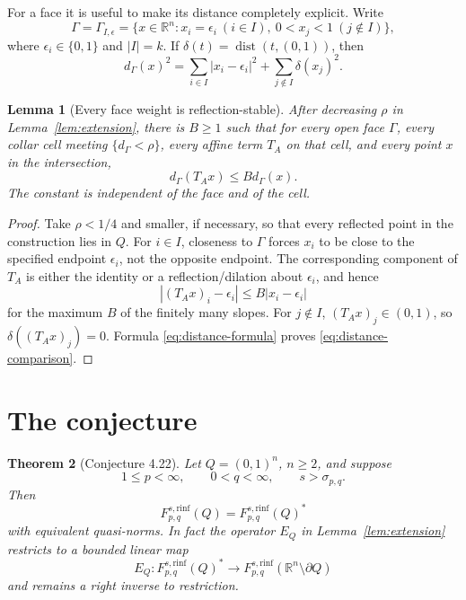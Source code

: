 \documentclass[11pt]{article}
\newtheorem{theorem}{Theorem}
\newtheorem{lemma}[theorem]{Lemma}
\newcommand{\R}{\mathbb R}
\newcommand{\dist}{\operatorname{dist}}
\newcommand{\rinf}{\mathrm{rinf}}
\begin{document}
For a face it is useful to make its distance completely explicit.  Write
\begin{equation}\label{eq:face}
 \Gamma=\Gamma_{I,\epsilon}
 =\{x\in\R^n:x_i=\epsilon_i\ (i\in I),\ 0<x_j<1\ (j\notin I)\},
\end{equation}
where $\epsilon_i\in\{0,1\}$ and $|I|=k$.  If
$\delta(t)=\dist(t,(0,1))$, then
\begin{equation}\label{eq:distance-formula}
 d_\Gamma(x)^2=
 \sum_{i\in I}|x_i-\epsilon_i|^2+
 \sum_{j\notin I}\delta(x_j)^2.
\end{equation}

\begin{lemma}[Every face weight is reflection-stable]\label{lem:distance}
After decreasing $\rho$ in Lemma~\ref{lem:extension}, there is $B\ge1$
such that for every open face $\Gamma$, every collar cell meeting
$\{d_\Gamma<\rho\}$, every affine term $T_A$ on that cell, and every point
$x$ in the intersection,
\begin{equation}\label{eq:distance-comparison}
 d_\Gamma(T_Ax)\le B d_\Gamma(x).
\end{equation}
The constant is independent of the face and of the cell.
\end{lemma}

\begin{proof}
Take $\rho<1/4$ and smaller, if necessary, so that every reflected point
in the construction lies in $Q$.  For $i\in I$, closeness to $\Gamma$
forces $x_i$ to be close to the specified endpoint $\epsilon_i$, not the
opposite endpoint.  The corresponding component of $T_A$ is either the
identity or a reflection/dilation about $\epsilon_i$, and hence
\[
 |(T_Ax)_i-\epsilon_i|\le B|x_i-\epsilon_i|
\]
for the maximum $B$ of the finitely many slopes.  For $j\notin I$,
$(T_Ax)_j\in(0,1)$, so $\delta((T_Ax)_j)=0$.  Formula
\eqref{eq:distance-formula} proves \eqref{eq:distance-comparison}.
\end{proof}

\section{The conjecture}

\begin{theorem}[Conjecture 4.22]\label{thm:main}
Let $Q=(0,1)^n$, $n\ge2$, and suppose
\[
 1\le p<\infty,\qquad 0<q<\infty,\qquad s>\sigma_{p,q}.
\]
Then
\[
 F_{p,q}^{s,\rinf}(Q)=F_{p,q}^{s,\rinf}(Q)^*
\]
with equivalent quasi-norms.  In fact the operator $E_Q$ in
Lemma~\ref{lem:extension} restricts to a bounded linear map
\[
 E_Q:F_{p,q}^{s,\rinf}(Q)^*\longrightarrow
 F_{p,q}^{s,\rinf}(\R^n\setminus\partial Q)
\]
and remains a right inverse to restriction.
\end{theorem}
\end{document}
